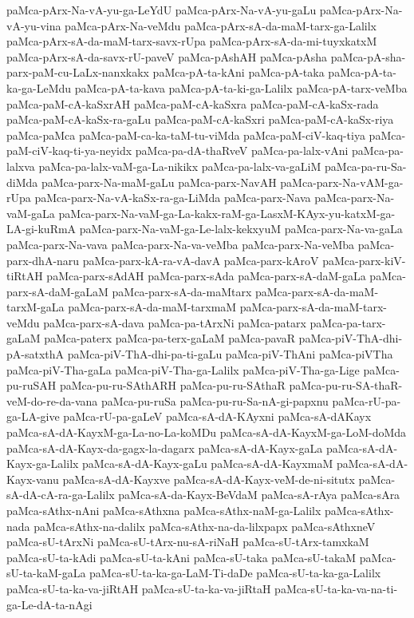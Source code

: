 {paMca-pArx-Na-vA-yu-ga-LeYdU
paMca-pArx-Na-vA-yu-gaLu
paMca-pArx-Na-vA-yu-vina
paMca-pArx-Na-veMdu
paMca-pArx-sA-da-maM-tarx-ga-Lalilx
paMca-pArx-sA-da-maM-tarx-savx-rUpa
paMca-pArx-sA-da-mi-tuyxkatxM
paMca-pArx-sA-da-savx-rU-paveV
paMca-pAshAH
paMca-pAsha
paMca-pA-sha-parx-paM-cu-LaLx-nanxkakx
paMca-pA-ta-kAni
paMca-pA-taka
paMca-pA-ta-ka-ga-LeMdu
paMca-pA-ta-kava
paMca-pA-ta-ki-ga-Lalilx
paMca-pA-tarx-veMba
paMca-paM-cA-kaSxrAH
paMca-paM-cA-kaSxra
paMca-paM-cA-kaSx-rada
paMca-paM-cA-kaSx-ra-gaLu
paMca-paM-cA-kaSxri
paMca-paM-cA-kaSx-riya
paMca-paMca
paMca-paM-ca-ka-taM-tu-viMda
paMca-paM-ciV-kaq-tiya
paMca-paM-ciV-kaq-ti-ya-neyidx
paMca-pa-dA-thaRveV
paMca-pa-lalx-vAni
paMca-pa-lalxva
paMca-pa-lalx-vaM-ga-La-nikikx
paMca-pa-lalx-va-gaLiM
paMca-pa-ru-Sa-diMda
paMca-parx-Na-maM-gaLu
paMca-parx-NavAH
paMca-parx-Na-vAM-ga-rUpa
paMca-parx-Na-vA-kaSx-ra-ga-LiMda
paMca-parx-Nava
paMca-parx-Na-vaM-gaLa
paMca-parx-Na-vaM-ga-La-kakx-raM-ga-LasxM-KAyx-yu-katxM-ga-LA-gi-kuRmA
paMca-parx-Na-vaM-ga-Le-lalx-kekxyuM
paMca-parx-Na-va-gaLa
paMca-parx-Na-vava
paMca-parx-Na-va-veMba
paMca-parx-Na-veMba
paMca-parx-dhA-naru
paMca-parx-kA-ra-vA-davA
paMca-parx-kAroV
paMca-parx-kiV-tiRtAH
paMca-parx-sAdAH
paMca-parx-sAda
paMca-parx-sA-daM-gaLa
paMca-parx-sA-daM-gaLaM
paMca-parx-sA-da-maMtarx
paMca-parx-sA-da-maM-tarxM-gaLa
paMca-parx-sA-da-maM-tarxmaM
paMca-parx-sA-da-maM-tarx-veMdu
paMca-parx-sA-dava
paMca-pa-tArxNi
paMca-patarx
paMca-pa-tarx-gaLaM
paMca-paterx
paMca-pa-terx-gaLaM
paMca-pavaR
paMca-piV-ThA-dhi-pA-satxthA
paMca-piV-ThA-dhi-pa-ti-gaLu
paMca-piV-ThAni
paMca-piVTha
paMca-piV-Tha-gaLa
paMca-piV-Tha-ga-Lalilx
paMca-piV-Tha-ga-Lige
paMca-pu-ruSAH
paMca-pu-ru-SAthARH
paMca-pu-ru-SAthaR
paMca-pu-ru-SA-thaR-veM-do-re-da-vana
paMca-pu-ruSa
paMca-pu-ru-Sa-nA-gi-papxnu
paMca-rU-pa-ga-LA-give
paMca-rU-pa-gaLeV
paMca-sA-dA-KAyxni
paMca-sA-dAKayx
paMca-sA-dA-KayxM-ga-La-no-La-koMDu
paMca-sA-dA-KayxM-ga-LoM-doMda
paMca-sA-dA-Kayx-da-gagx-la-dagarx
paMca-sA-dA-Kayx-gaLa
paMca-sA-dA-Kayx-ga-Lalilx
paMca-sA-dA-Kayx-gaLu
paMca-sA-dA-KayxmaM
paMca-sA-dA-Kayx-vanu
paMca-sA-dA-Kayxve
paMca-sA-dA-Kayx-veM-de-ni-situtx
paMca-sA-dA-cA-ra-ga-Lalilx
paMca-sA-da-Kayx-BeVdaM
paMca-sA-rAya
paMca-sAra
paMca-sAthx-nAni
paMca-sAthxna
paMca-sAthx-naM-ga-Lalilx
paMca-sAthx-nada
paMca-sAthx-na-dalilx
paMca-sAthx-na-da-lilxpapx
paMca-sAthxneV
paMca-sU-tArxNi
paMca-sU-tArx-nu-sA-riNaH
paMca-sU-tArx-tamxkaM
paMca-sU-ta-kAdi
paMca-sU-ta-kAni
paMca-sU-taka
paMca-sU-takaM
paMca-sU-ta-kaM-gaLa
paMca-sU-ta-ka-ga-LaM-Ti-daDe
paMca-sU-ta-ka-ga-Lalilx
paMca-sU-ta-ka-va-jiRtAH
paMca-sU-ta-ka-va-jiRtaH
paMca-sU-ta-ka-va-na-ti-ga-Le-dA-ta-nAgi
}
